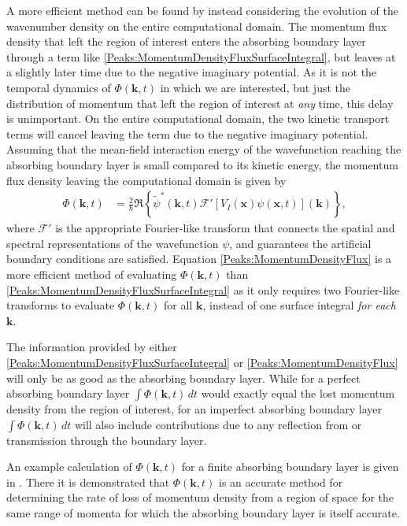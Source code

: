 A more efficient method can be found by instead considering the evolution of the wavenumber density on the entire computational domain. The momentum flux density that left the region of interest enters the absorbing boundary layer through a term like \eqref{Peaks:MomentumDensityFluxSurfaceIntegral}, but leaves at a slightly later time due to the negative imaginary potential. As it is not the temporal dynamics of $\Phi(\bm{k}, t)$ in which we are interested, but just the distribution of momentum that left the region of interest at \emph{any} time, this delay is unimportant. On the entire computational domain, the two kinetic transport terms will cancel leaving the term due to the negative imaginary potential. Assuming that the mean-field interaction energy of the wavefunction reaching the absorbing boundary layer is small compared to its kinetic energy, the momentum flux density leaving the computational domain is given by
\begin{align}
    \label{Peaks:MomentumDensityFlux}
    \Phi(\bm{k}, t)&=\frac{2}{\hbar} \Re \left\{ \widetilde{\psi}^*(\bm{k}, t) \mathcal{F}'\left[ V_I(\bm{x}) \psi(\bm{x}, t)\right](\bm{k}) \right\},
\end{align}
where $\mathcal{F}'$ is the appropriate Fourier-like transform that connects the spatial and spectral representations of the wavefunction $\psi$, and guarantees the artificial boundary conditions are satisfied. Equation \eqref{Peaks:MomentumDensityFlux} is a more efficient method of evaluating $\Phi(\bm{k}, t)$ than \eqref{Peaks:MomentumDensityFluxSurfaceIntegral} as it only requires two Fourier-like transforms to evaluate $\Phi(\bm{k}, t)$ for all $\bm{k}$, instead of one surface integral \emph{for each} $\bm{k}$.

The information provided by either \eqref{Peaks:MomentumDensityFluxSurfaceIntegral} or \eqref{Peaks:MomentumDensityFlux} will only be as good as the absorbing boundary layer. While for a perfect absorbing boundary layer $\int \Phi(\bm{k}, t)\, dt$ would exactly equal the lost momentum density from the region of interest, for an imperfect absorbing boundary layer $\int \Phi(\bm{k}, t)\, dt$ will also include contributions due to any reflection from or transmission through the boundary layer. 

An example calculation of $\Phi(\bm{k}, t)$ for a finite absorbing boundary layer is given in . There it is demonstrated that $\Phi(\bm{k}, t)$ is an accurate method for determining the rate of loss of momentum density from a region of space for the same range of momenta for which the absorbing boundary layer is itself accurate.

